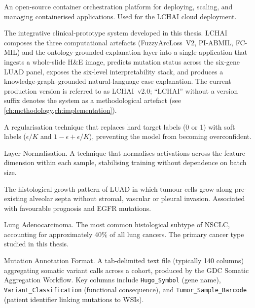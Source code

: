 \begin{description}[style=nextline,leftmargin=4cm]
\item[Kubernetes] An open-source container orchestration platform for deploying, scaling, and managing containerised applications.  Used for the LCHAI cloud deployment.


\item[LCHAI (Lung Cancer Histologic Analysis with AI)] The integrative clinical-prototype system developed in this thesis.  LCHAI composes the three computational artefacts (FuzzyArcLoss~V2, PI-ABMIL, FC-MIL) and the ontology-grounded explanation layer into a single application that ingests a whole-slide H\&E image, predicts mutation status across the six-gene LUAD panel, exposes the six-level interpretability stack, and produces a knowledge-graph--grounded natural-language case explanation.  The current production version is referred to as LCHAI~v2.0; ``LCHAI'' without a version suffix denotes the system as a methodological artefact (see \cref{ch:methodology,ch:implementation}).


\item[Label smoothing] A regularisation technique that replaces hard target labels (0 or 1) with soft labels ($\epsilon/K$ and $1-\epsilon+\epsilon/K$), preventing the model from becoming overconfident.


\item[LayerNorm] Layer Normalisation.  A technique that normalises activations across the feature dimension within each sample, stabilising training without dependence on batch size.


\item[Lepidic pattern] The histological growth pattern of LUAD in which tumour cells grow along pre-existing alveolar septa without stromal, vascular or pleural invasion.  Associated with favourable prognosis and EGFR mutations.


\item[LUAD] Lung Adenocarcinoma.  The most common histological subtype of NSCLC, accounting for approximately 40\% of all lung cancers.  The primary cancer type studied in this thesis.


\item[MAF file] Mutation Annotation Format.  A tab-delimited text file (typically 140 columns) aggregating somatic variant calls across a cohort, produced by the GDC Somatic Aggregation Workflow.  Key columns include \texttt{Hugo\_Symbol} (gene name), \texttt{Variant\_Classification} (functional consequence), and \texttt{Tumor\_Sample\_Barcode} (patient identifier linking mutations to WSIs).



\end{description}
